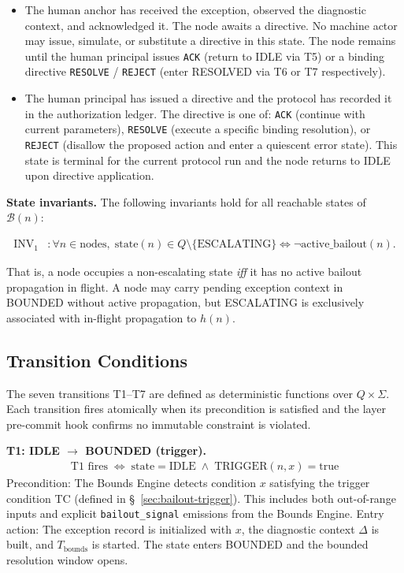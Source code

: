 \begin{itemize}
\item[\textbf{HUMAN\_ACKNOWLEDGED.}] The human anchor has received the exception, observed the diagnostic context, and acknowledged it. The node awaits a directive. No machine actor may issue, simulate, or substitute a directive in this state. The node remains until the human principal issues \texttt{ACK} (return to IDLE via T5) or a binding directive \texttt{RESOLVE} / \texttt{REJECT} (enter RESOLVED via T6 or T7 respectively).

\item[\textbf{RESOLVED.}] The human principal has issued a directive and the protocol has recorded it in the authorization ledger. The directive is one of: \texttt{ACK} (continue with current parameters), \texttt{RESOLVE} (execute a specific binding resolution), or \texttt{REJECT} (disallow the proposed action and enter a quiescent error state). This state is terminal for the current protocol run and the node returns to IDLE upon directive application.
\end{itemize}

\bigskip
\noindent\textbf{State invariants.} The following invariants hold for all reachable states of $\mathcal{B}(n)$:

\begin{align}
\text{INV}_1 &: \forall n \in \text{nodes},\; \text{state}(n) \in Q \setminus \{\text{ESCALATING}\} \iff \neg\text{active\_bailout}(n). \tag{INV-1}
\end{align}

That is, a node occupies a non-escalating state \emph{iff} it has no active bailout propagation in flight. A node may carry pending exception context in BOUNDED without active propagation, but ESCALATING is exclusively associated with in-flight propagation to $h(n)$.

\subsection{Transition Conditions}\label{sec:transitions}

The seven transitions T1–T7 are defined as deterministic functions over $Q \times \Sigma$. Each transition fires atomically when its precondition is satisfied and the \fact{} layer pre-commit hook confirms no immutable constraint is violated.

\bigskip
\noindent\textbf{T1: IDLE $\rightarrow$ BOUNDED (trigger).}
\begin{align}
\text{T1 fires} \;\iff\; \text{state} = \text{IDLE} \;\land\; \text{TRIGGER}(n, x) = \text{true} \tag{T1}
\end{align}
Precondition: The Bounds Engine detects condition $x$ satisfying the trigger condition TC (defined in \S~\ref{sec:bailout-trigger}). This includes both out-of-range inputs and explicit \texttt{bailout\_signal} emissions from the Bounds Engine. Entry action: The exception record is initialized with $x$, the diagnostic context $\Delta$ is built, and $T_{\text{bounds}}$ is started. The state enters BOUNDED and the bounded resolution window opens.

